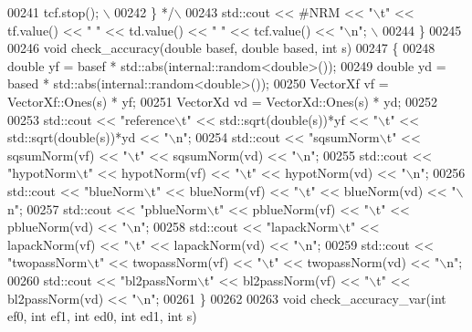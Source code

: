 \begin{DoxyCode}
00241 \textcolor{comment}{    tcf.stop(); \(\backslash\)}
00242 \textcolor{comment}{  \} */}\textcolor{preprocessor}{\(\backslash\)}
00243 \textcolor{preprocessor}{  std::cout << #NRM << "\(\backslash\)t" << tf.value() << "   " << td.value() <<  "    " << tcf.value() << "\(\backslash\)n"; \(\backslash\)}
00244 \textcolor{preprocessor}{\}}
00245 
00246 \textcolor{keywordtype}{void} check\_accuracy(\textcolor{keywordtype}{double} basef, \textcolor{keywordtype}{double} based, \textcolor{keywordtype}{int} s)
00247 \{
00248   \textcolor{keywordtype}{double} yf = basef * std::abs(internal::random<double>());
00249   \textcolor{keywordtype}{double} yd = based * std::abs(internal::random<double>());
00250   VectorXf vf = VectorXf::Ones(s) * yf;
00251   VectorXd vd = VectorXd::Ones(s) * yd;
00252 
00253   std::cout << \textcolor{stringliteral}{"reference\(\backslash\)t"} << std::sqrt(\textcolor{keywordtype}{double}(s))*yf << \textcolor{stringliteral}{"\(\backslash\)t"} << std::sqrt(\textcolor{keywordtype}{double}(s))*yd << \textcolor{stringliteral}{"\(\backslash\)n"};
00254   std::cout << \textcolor{stringliteral}{"sqsumNorm\(\backslash\)t"} << sqsumNorm(vf) << \textcolor{stringliteral}{"\(\backslash\)t"} << sqsumNorm(vd) << \textcolor{stringliteral}{"\(\backslash\)n"};
00255   std::cout << \textcolor{stringliteral}{"hypotNorm\(\backslash\)t"} << hypotNorm(vf) << \textcolor{stringliteral}{"\(\backslash\)t"} << hypotNorm(vd) << \textcolor{stringliteral}{"\(\backslash\)n"};
00256   std::cout << \textcolor{stringliteral}{"blueNorm\(\backslash\)t"} << blueNorm(vf) << \textcolor{stringliteral}{"\(\backslash\)t"} << blueNorm(vd) << \textcolor{stringliteral}{"\(\backslash\)n"};
00257   std::cout << \textcolor{stringliteral}{"pblueNorm\(\backslash\)t"} << pblueNorm(vf) << \textcolor{stringliteral}{"\(\backslash\)t"} << pblueNorm(vd) << \textcolor{stringliteral}{"\(\backslash\)n"};
00258   std::cout << \textcolor{stringliteral}{"lapackNorm\(\backslash\)t"} << lapackNorm(vf) << \textcolor{stringliteral}{"\(\backslash\)t"} << lapackNorm(vd) << \textcolor{stringliteral}{"\(\backslash\)n"};
00259   std::cout << \textcolor{stringliteral}{"twopassNorm\(\backslash\)t"} << twopassNorm(vf) << \textcolor{stringliteral}{"\(\backslash\)t"} << twopassNorm(vd) << \textcolor{stringliteral}{"\(\backslash\)n"};
00260   std::cout << \textcolor{stringliteral}{"bl2passNorm\(\backslash\)t"} << bl2passNorm(vf) << \textcolor{stringliteral}{"\(\backslash\)t"} << bl2passNorm(vd) << \textcolor{stringliteral}{"\(\backslash\)n"};
00261 \}
00262 
00263 \textcolor{keywordtype}{void} check\_accuracy\_var(\textcolor{keywordtype}{int} ef0, \textcolor{keywordtype}{int} ef1, \textcolor{keywordtype}{int} ed0, \textcolor{keywordtype}{int} ed1, \textcolor{keywordtype}{int} s)

\end{DoxyCode}
